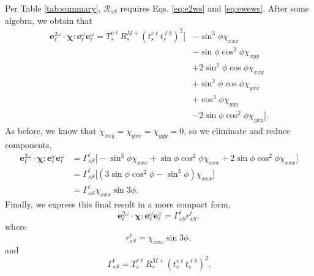Per Table \ref{tab:summary}, $\mathcal{R}_{sS}$ requires Eqs. \eqref{eq:e2ws}
and \eqref{eq:ewews}. After some algebra, we obtain that
\begin{equation*}
\begin{split}
\mathbf{e}^{2\omega}_{\ell}\cdot\boldsymbol{\chi}:
\mathbf{e}^{\omega}_{\ell}\mathbf{e}^{\omega}_{\ell} = 
T_{s}^{v\ell}R^{M+}_{s}
\left(t^{v\ell}_{s}t^{\ell b}_{s}\right)^{2}
\big[
&- \sin^{3}\phi\chi_{xxx}\\
&- \sin\phi\cos^{2}\phi\chi_{xyy}\\
&+ 2\sin^{2}\phi\cos\phi\chi_{xxy}\\
&+ \sin^{2}\phi\cos\phi\chi_{yxx}\\
&+ \cos^{3}\phi\chi_{yyy}\\
&- 2\sin\phi\cos^{2}\phi\chi_{yxy}
\big].
\end{split}
\end{equation*}
As before, we know that $\chi_{xxy}=\chi_{yxx}=\chi_{yyy}=0$, so we eliminate
and reduce components,
\begin{equation*}
\begin{split}
\mathbf{e}^{2\omega}_{\ell}\cdot\boldsymbol{\chi}:
\mathbf{e}^{\omega}_{\ell}\mathbf{e}^{\omega}_{\ell} &= 
\Gamma^{\ell}_{sS}
\big[
- \sin^{3}\phi\chi_{xxx}
+ \sin\phi\cos^{2}\phi\chi_{xxx}
+ 2\sin\phi\cos^{2}\phi\chi_{xxx}
\big]\\
&= 
\Gamma^{\ell}_{sS}
\big[
(3\sin\phi\cos^{2}\phi- \sin^{3}\phi)\chi_{xxx}
\big]\\
&= \Gamma^{\ell}_{sS}\chi_{xxx}\sin3\phi.
\end{split}
\end{equation*}
Finally, we express this final result in a more compact form,
\begin{equation}
\mathbf{e}^{2\omega}_{\ell}\cdot\boldsymbol{\chi}:
\mathbf{e}^{\omega}_{\ell}\mathbf{e}^{\omega}_{\ell} = 
\Gamma^{\ell}_{sS}r^{\ell}_{sS},
\end{equation}
where
\begin{equation}
r^{\ell}_{sS} = \chi_{xxx}\sin3\phi,
\end{equation}
and
\begin{equation}
\Gamma^{\ell}_{sS} = 
T_{s}^{v\ell}R^{M+}_{s}\left(t^{v\ell}_{s}t^{\ell b}_{s}\right)^{2}.
\end{equation}

